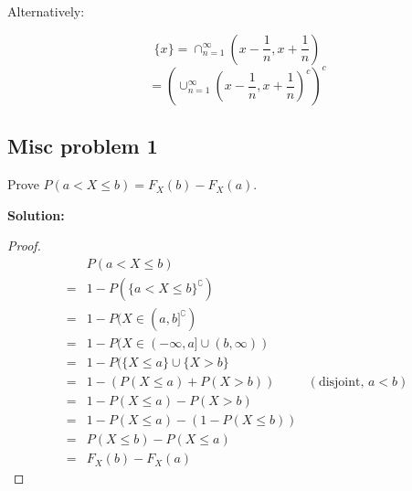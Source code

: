 \documentclass{article}
\begin{document}
Alternatively:

\[\{x\} = \cap_{n=1}^{\infty} (x-\frac{1}{n}, x+\frac{1}{n})\]
\[= (\cup_{n=1}^{\infty} (x-\frac{1}{n}, x+\frac{1}{n})^c)^c\]

\subsection{Misc problem 1}

Prove \(P(a < X \leq b) = F_X(b)-F_X(a)\).

\textbf{Solution:}

\begin{proof}
\begin{align*}
     & P(a<X\leq b) \\
    =& 1-P(\{a<X\leq b\}^\complement) \\
    =& 1-P(X\in (a,b]^\complement) \\
    =& 1-P(X\in (-\infty,a] \cup (b,\infty)) \\
    =& 1-P(\{X\leq a\} \cup \{X>b\} \\
    =& 1-(P(X\leq a)+P(X>b)) & (\text{disjoint, }a<b) \\
    =& 1-P(X\leq a)-P(X>b) \\
    =& 1-P(X\leq a)-(1-P(X\leq b)) \\
    =& P(X\leq b)-P(X\leq a) \\
    =& F_X(b)-F_X(a)
\end{align*}
\end{proof}
\end{document}
